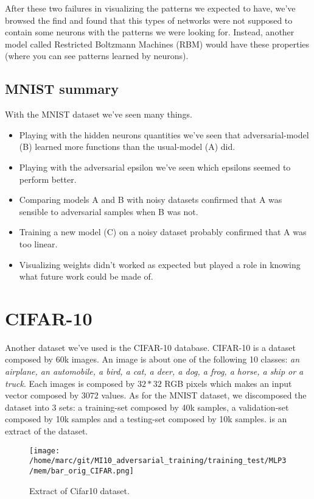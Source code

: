			After these two failures in visualizing the patterns we expected to have, we've browsed the find and found that this types of networks were not supposed to contain some neurons with the patterns we were looking for. Instead, another model called Restricted Boltzmann Machines (RBM) would have these properties (where you can see patterns learned by neurons).

		\subsection{MNIST summary}
		\label{ssub:mnist_summary}
			With the MNIST dataset we've seen many things. 
			\begin{itemize}
				\item Playing with the hidden neurons quantities we've seen that adversarial-model (B) learned more functions than the usual-model (A) did.
				\item Playing with the adversarial epsilon we've seen which epsilons seemed to perform better.
				\item Comparing models A and B with noisy datasets confirmed that A was sensible to adversarial samples when B was not.
				\item Training a new model (C) on a noisy dataset probably confirmed that A was too linear.
				\item Visualizing weights didn't worked as expected but played a role in knowing what future work could be made of.
			\end{itemize}
		
	
	\section{CIFAR-10}
	\label{sub:cifar_10}
		Another dataset we've used is the CIFAR-10 database. CIFAR-10 is a dataset composed by 60k images. An image is about one of the following 10 classes: \textit{an airplane, an automobile, a bird, a cat, a deer, a dog, a frog, a horse, a ship or a truck}. Each images is composed by $32*32$ RGB pixels which makes an input vector composed by $3072$ values. As for the MNIST dataset, we discomposed the dataset into 3 sets: a training-set composed by 40k samples, a validation-set composed by 10k samples and a testing-set composed by 10k samples.  is an extract of the dataset.

		\begin{figure}
			\centering
			\texttt{[image: /home/marc/git/MI10\_adversarial\_training/training\_test/MLP3/mem/bar\_orig\_CIFAR.png]}
			\caption{Extract of Cifar10 dataset.}
			\label{fig:cifar}
		\end{figure}


